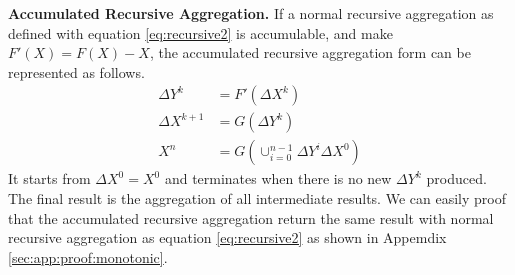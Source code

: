 {	\textbf{Accumulated Recursive Aggregation.} If a normal recursive aggregation  as defined with equation \ref{eq:recursive2} is accumulable, and make $F'(X)=F(X)-X$,  the accumulated recursive aggregation form can be represented as follows.
	\begin{equation}\label{eq:accumasync}
	\begin{aligned}
	\Delta Y^{k}&= F'(\Delta X^k)\\
	\Delta X^{k+1}&= G(\Delta Y^{k})\\
	X^{n}&=G(\cup_{i=0}^{n-1} \Delta Y^{i}\Delta X^0)
	\end{aligned}
	\end{equation}
	It starts from $\Delta X^0=X^0$ and terminates when there is no new $\Delta Y^k$ produced. The final result is the aggregation of all intermediate results. We can easily proof that the accumulated recursive aggregation return the same result with normal recursive aggregation as equation \ref{eq:recursive2} as shown in Appemdix \ref{sec:app:proof:monotonic}.
	

}
